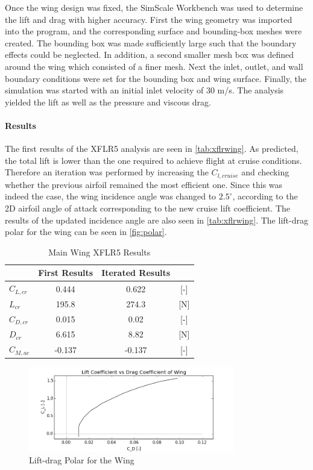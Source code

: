 Once the wing design was fixed, the SimScale Workbench was used to determine the lift and drag with higher accuracy. First the wing geometry was imported into the program, and the corresponding surface and bounding-box meshes were created. The bounding box was made sufficiently large such that the boundary effects could be neglected. In addition, a second smaller mesh box was defined around the wing which consisted of a finer mesh. Next the inlet, outlet, and wall boundary conditions were set for the bounding box and wing surface. Finally, the simulation was started with an initial inlet velocity of 30 m/s. The analysis yielded the lift as well as the pressure and viscous drag.

\paragraph{Results} The first results of the XFLR5 analysis are seen in \autoref{tab:xflrwing}. As predicted, the total lift is lower than the one required to achieve flight at cruise conditions. Therefore an iteration was performed by increasing the $C_{l,cruise}$ and checking whether the previous airfoil remained the most efficient one. Since this was indeed the case, the wing incidence angle was changed to $2.5^{\circ}$, according to the 2D airfoil angle of attack corresponding to the new cruise lift coefficient. The results of the updated incidence angle are also seen in \autoref{tab:xflrwing}. The lift-drag polar for the wing can be seen in \autoref{fig:polar}.

\begin{table}[H]
\centering
\caption{Main Wing XFLR5 Results}
\label{tab:xflrwing}
\begin{tabular}{lccc}
\toprule
&\bfseries First Results &\bfseries Iterated Results & \\ \midrule
\textbf{$C_{L,cr}$}   & 0.444 & 0.622 & {[}-{]} \\\hdashline
\textbf{$L_{cr}$}    & 195.8 & 274.3 & {[}N{]} \\\hdashline
\textbf{$C_{D,cr}$}   & 0.015 & 0.02 & {[}-{]} \\\hdashline
\textbf{$D_{cr}$}    & 6.615 & 8.82 & {[}N{]} \\\hdashline
\textbf{$C_{M,ac}$} & -0.137  & -0.137  & {[}-{]} \\ \bottomrule
\end{tabular}
\end{table}

\begin{figure}[H]
    \centering
    \includegraphics[width=0.8\textwidth]{Aerodynamics/Figures/wpol}
    \caption{Lift-drag Polar for the Wing}
    \label{fig:polar}
\end{figure}

